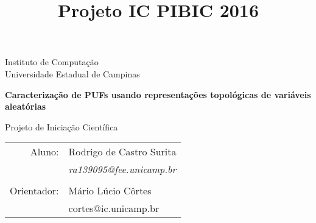 \documentclass[pdftex,12pt]{article}
\title{Projeto IC PIBIC 2016}
\begin{document}
\thispagestyle{empty}


\begin{center} 
\Large 
Instituto de Computação \\
Universidade Estadual de Campinas

\end{center}


\bigskip
\bigskip
\bigskip

{\LARGE
  \begin{center}
      \textbf{Caracterização de PUFs usando representações 
      topológicas de variáveis aleatórias} 


    \vspace{1cm}

   Projeto de Iniciação Científica
  \end{center}
}

\vfill


\hspace{3cm}
\begin{tabular}{rl}

	Aluno:  & Rodrigo de Castro Surita \\
    		& \emph{ra139095@fee.unicamp.br} \\ 
    \\
          
  	Orientador: & Mário Lúcio Côrtes \\
                & cortes@ic.unicamp.br \\ 
         
\end{tabular}
\newpage
\end{document}
